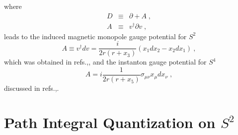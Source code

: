 \documentclass[12pt,a4paper]{article}
\begin{document}
where 
\begin{eqnarray}
D &\equiv &\partial +A\;, \\
A &\equiv &v^{\dag }\partial v\;,  \nonumber
\end{eqnarray}
leads to the induced magnetic monopole gauge potential for $S^{2}$%
\begin{equation}
A\equiv v^{\dag }dv=\frac{i}{2r\left( r+x_{3}\right) }\left(
x_{1}dx_{2}-x_{2}dx_{1}\right) \ ,
\end{equation}
which was obtained in refs.\cite{McMullan:1995wz},\cite{Ohnuki:1993cb}, and
the instanton gauge potential for $S^{4}$%
\begin{equation}
A=i\frac{1}{2r\left( r+x_{5}\right) }\sigma _{\mu \nu }x_{\mu }dx_{\nu }\;,
\end{equation}
discussed in refs.\cite{McMullan:1994ip},\cite{Fujii:1995wn}.

\section{Path Integral Quantization on $S^{2}$}

\bigskip
\end{document}
